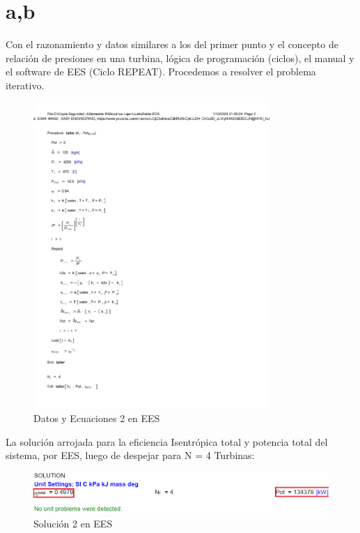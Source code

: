 \documentclass{article}
\theoremstyle{mytheoremstyle}
\theoremstyle{mytheoremstyle}
\theoremstyle{myproblemstyle}
\begin{document}
\section{a,b}
Con el razonamiento y datos similares a los del primer punto y el concepto de relación de presiones en una turbina, lógica de programación (ciclos), el manual y el software de EES (Ciclo REPEAT). \singlespacing Procedemos a resolver el problema iterativo.
\begin{figure}[h!] %
    \centering
    \includegraphics[width=0.8\textwidth]{ecuations222.jpg} %
    \caption{Datos y Ecuaciones 2 en EES}
    \label{fig:mi_imagen}
\end{figure}
\newpage
La solución arrojada para la eficiencia Isentrópica total y potencia total del sistema, por EES, luego de despejar para N = 4 Turbinas:
\begin{figure}[h!] %
    \centering
    \includegraphics[width=1.1\textwidth]{solutions2.png} %
    \caption{Solución 2 en EES}
    \label{fig:mi_imagen}
\end{figure}
\end{document}
